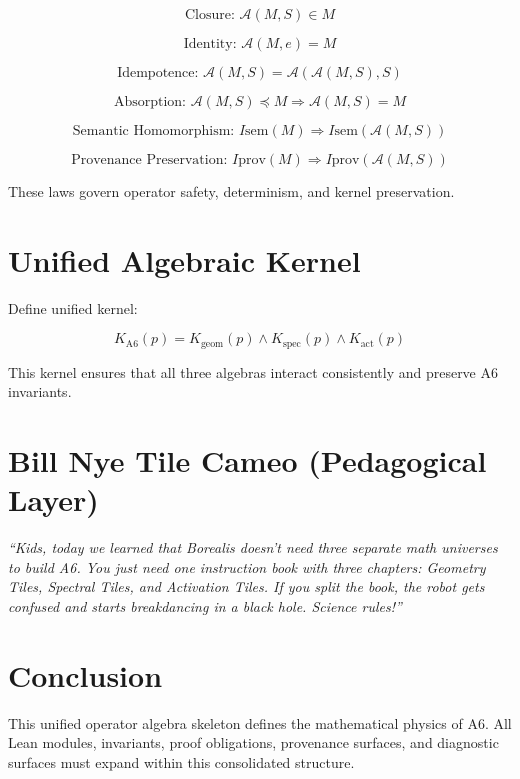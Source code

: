 \documentclass[11pt]{article}
\begin{document}
\[
\text{Closure: } \mathcal{A}(M, S) \in M
\]

\[
\text{Identity: } \mathcal{A}(M, e) = M
\]

\[
\text{Idempotence: }
\mathcal{A}(M, S) = \mathcal{A}(\mathcal{A}(M, S), S)
\]

\[
\text{Absorption: }
\mathcal{A}(M, S) \preceq M \Rightarrow \mathcal{A}(M, S) = M
\]

\[
\text{Semantic Homomorphism: }
I{\text{sem}}(M) \Rightarrow I{\text{sem}}(\mathcal{A}(M, S))
\]

\[
\text{Provenance Preservation: }
I{\text{prov}}(M) \Rightarrow I{\text{prov}}(\mathcal{A}(M, S))
\]

These laws govern operator safety, determinism, and kernel preservation.

\section{Unified Algebraic Kernel}

Define unified kernel:

\[
K_{\text{A6}}(p) =
  K_{\text{geom}}(p)
  \land K_{\text{spec}}(p)
  \land K_{\text{act}}(p)
\]

This kernel ensures that all three algebras interact consistently and preserve
A6 invariants.

\section{Bill Nye Tile Cameo (Pedagogical Layer)}

\textit{
“Kids, today we learned that Borealis doesn’t need three separate math
universes to build A6. You just need one instruction book with three chapters:
Geometry Tiles, Spectral Tiles, and Activation Tiles. If you split the book,
the robot gets confused and starts breakdancing in a black hole. Science rules!”
}

\section{Conclusion}

This unified operator algebra skeleton defines the mathematical physics of A6.
All Lean modules, invariants, proof obligations, provenance surfaces, and
diagnostic surfaces must expand within this consolidated structure.
\end{document}
